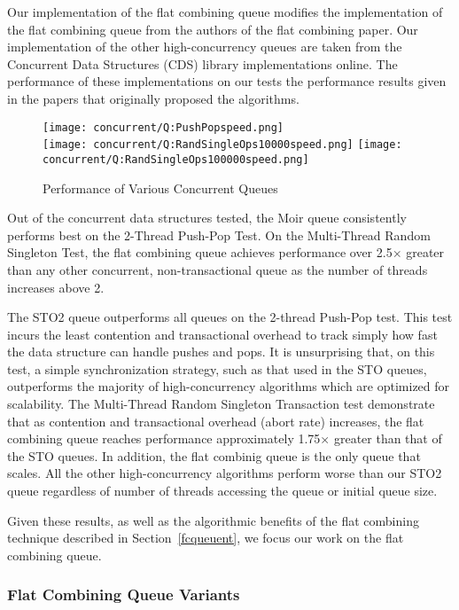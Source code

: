  Our implementation of the flat combining queue modifies the implementation of the flat combining queue from the authors of the flat combining paper\cite{flatcombining}. Our implementation of the other high-concurrency queues are taken from the Concurrent Data Structures (CDS) library implementations online\cite{libcds}. The performance of these implementations on our tests the performance results given in the papers that originally proposed the algorithms.

\begin{figure}[h!]
\centering
    \texttt{[image: concurrent/Q:PushPopspeed.png]}\\
    \texttt{[image: concurrent/Q:RandSingleOps10000speed.png]}
    \texttt{[image: concurrent/Q:RandSingleOps100000speed.png]}
\caption{Performance of Various Concurrent Queues}
\label{fig:concurrent_queues}
\end{figure}

Out of the concurrent data structures tested, the Moir queue\cite{queue2} consistently performs best on the 2-Thread Push-Pop Test. On the Multi-Thread Random Singleton Test, the flat combining queue achieves performance over 2.5$\times$ greater than any other concurrent, non-transactional queue as the number of threads increases above 2.

The STO2 queue outperforms all queues on the 2-thread Push-Pop test. This test incurs the least contention and transactional overhead to track simply how fast the data structure can handle pushes and pops. It is unsurprising that, on this test, a simple synchronization strategy, such as that used in the STO queues, outperforms the majority of high-concurrency algorithms which are optimized for scalability. The Multi-Thread Random Singleton Transaction test demonstrate that as contention and transactional overhead (abort rate) increases, the flat combining queue reaches performance approximately 1.75$\times$ greater than that of the STO queues. In addition, the flat combinig queue is the only queue that scales. All the other high-concurrency algorithms perform worse than our STO2 queue regardless of number of threads accessing the queue or initial queue size.

Given these results, as well as the algorithmic benefits of the flat combining technique described in Section~\ref{fcqueuent}, we focus our work on the flat combining queue.

\subsubsection{Flat Combining Queue Variants}

